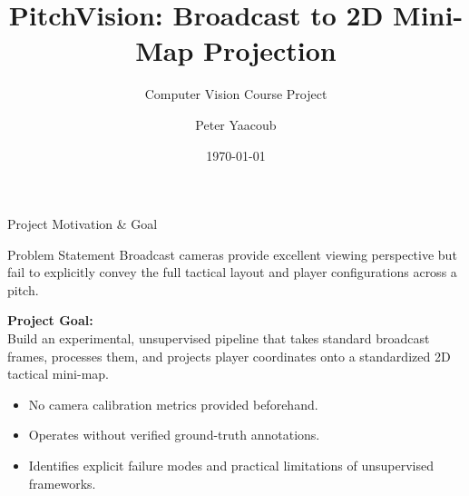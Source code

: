 \documentclass[10pt]{beamer}
\title[PitchVision]{PitchVision: Broadcast to 2D Mini-Map Projection}
\subtitle{Computer Vision Course Project}
\author[Peter Yaacoub]{Peter Yaacoub}
\institute[Computer Vision]{Project Type: Productivity}
\date{\today}
\begin{document}
\begin{frame}
    \titlepage
\end{frame}

\begin{frame}{Project Motivation \& Goal}
    \begin{block}{Problem Statement}
        Broadcast cameras provide excellent viewing perspective but fail to explicitly convey the full tactical layout and player configurations across a pitch.
    \end{block}
    \vspace{0.3cm}
    \textbf{Project Goal:} \\
    Build an experimental, unsupervised pipeline that takes standard broadcast frames, processes them, and projects player coordinates onto a standardized 2D tactical mini-map.
    \vspace{0.3cm}
    \begin{itemize}
        \item No camera calibration metrics provided beforehand.
        \item Operates without verified ground-truth annotations.
        \item Identifies explicit failure modes and practical limitations of unsupervised frameworks.
    \end{itemize}
\end{frame}
\end{document}
